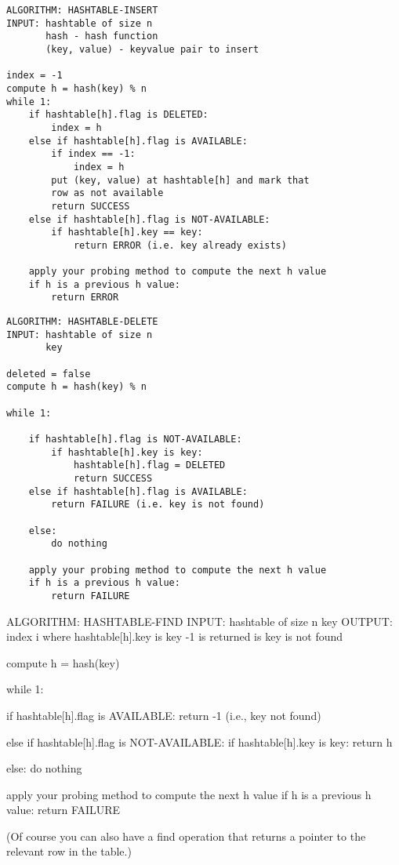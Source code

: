 \begin{Verbatim}[frame=single]
ALGORITHM: HASHTABLE-INSERT
INPUT: hashtable of size n
       hash - hash function
       (key, value) - keyvalue pair to insert

index = -1
compute h = hash(key) % n
while 1:
    if hashtable[h].flag is DELETED:
        index = h
    else if hashtable[h].flag is AVAILABLE:
        if index == -1:
            index = h
        put (key, value) at hashtable[h] and mark that
        row as not available
        return SUCCESS
    else if hashtable[h].flag is NOT-AVAILABLE:
        if hashtable[h].key == key:
            return ERROR (i.e. key already exists)
    
    apply your probing method to compute the next h value
    if h is a previous h value:
        return ERROR
\end{Verbatim}

\begin{Verbatim}[frame=single]
ALGORITHM: HASHTABLE-DELETE
INPUT: hashtable of size n
       key

deleted = false
compute h = hash(key) % n

while 1:
    
    if hashtable[h].flag is NOT-AVAILABLE:
        if hashtable[h].key is key:
            hashtable[h].flag = DELETED
            return SUCCESS
    else if hashtable[h].flag is AVAILABLE:
        return FAILURE (i.e. key is not found)

    else:
        do nothing

    apply your probing method to compute the next h value
    if h is a previous h value:
        return FAILURE
\end{Verbatim}


\begin{console}
ALGORITHM: HASHTABLE-FIND
INPUT: hashtable of size n
       key
OUTPUT: index i where hashtable[h].key is key
            -1 is returned is key is not found

compute h = hash(key) %

while 1:

    if hashtable[h].flag is AVAILABLE:
        return -1 (i.e., key not found)

    else if hashtable[h].flag is NOT-AVAILABLE:
        if hashtable[h].key is key:
            return h
            
    else:
        do nothing
        
    apply your probing method to compute the next h value
    if h is a previous h value:
        return FAILURE
\end{console}
(Of course you can also have a find operation that returns a pointer
to the relevant row in the table.)

